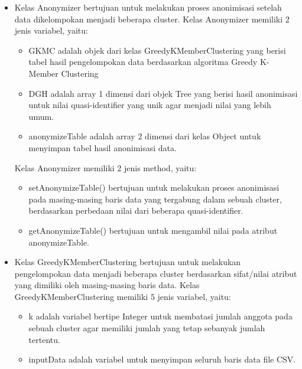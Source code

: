\begin{itemize}
\item Kelas Anonymizer bertujuan untuk melakukan proses anonimisasi setelah data dikelompokan menjadi beberapa cluster. Kelas Anonymizer memiliki 2 jenis variabel, yaitu:

\begin{itemize}

\item GKMC adalah objek dari kelas GreedyKMemberClustering yang berisi tabel hasil pengelompokan data berdasarkan algoritma Greedy K-Member Clustering

\item DGH adalah array 1 dimensi dari objek Tree yang berisi hasil anonimisasi untuk nilai quasi-identifier yang unik agar menjadi nilai yang lebih umum.

\item anonymizeTable adalah array 2 dimensi dari kelas Object untuk menyimpan tabel hasil anonimisasi data.

\end{itemize}

\noindent Kelas Anonymizer memiliki 2 jenis method, yaitu:

\begin{itemize}

\item setAnonymizeTable() bertujuan untuk melakukan proses anonimisasi pada masing-masing baris data yang tergabung dalam sebuah cluster, berdasarkan perbedaan nilai dari beberapa quasi-identifier.

\item getAnonymizeTable() bertujuan untuk mengambil nilai pada atribut anonymizeTable.

\end{itemize}


\item Kelas GreedyKMemberClustering bertujuan untuk melakukan pengelompokan data menjadi beberapa cluster berdasarkan sifat/nilai atribut yang dimiliki oleh masing-masing baris data. Kelas GreedyKMemberClustering memiliki 5 jenis variabel, yaitu:

\begin{itemize}

\item k adalah variabel bertipe Integer untuk membatasi jumlah anggota pada sebuah cluster agar memiliki jumlah yang tetap sebanyak jumlah tertentu.

\item inputData adalah variabel untuk menyimpan seluruh baris data file CSV.


\end{itemize}
\end{itemize}
